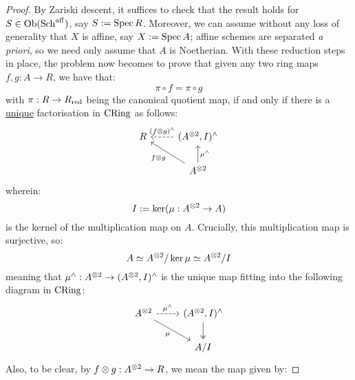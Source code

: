             \begin{proof}
                By Zariski descent, it suffices to check that the result holds for $S \in \mathrm{Ob}(\mathrm{Sch}^{\mathrm{aff}})$, say $S := \operatorname{Spec} R$. Moreover, we can assume without any loss of generality that $X$ is affine, say $X := \operatorname{Spec} A$; affine schemes are separated \textit{a priori}, so we need only assume that $A$ is Noetherian. With these reduction steps in place, the problem now becomes to prove that given any two ring maps $f, g: A \to R$, we have that:
                    $$\pi \circ f = \pi \circ g$$
                with $\pi: R \to R_{\mathrm{red}}$ being the canonical quotient map, if and only if there is a \underline{unique} factorisation in $\mathrm{CRing}$ as follows:
                    \begin{equation} \label{diagram: formal_neighbourhood_of_diagonal_algebraic}
                        \begin{tikzcd}
                        R & {(A^{\tensor 2}, I)^{\wedge}} \\
                        & {A^{\tensor 2}}
                        \arrow["{(f \tensor g)^{\wedge}}"', dashed, from=1-2, to=1-1]
                        \arrow["{f \tensor g}", from=2-2, to=1-1]
                        \arrow["{\mu^{\wedge}}"', from=2-2, to=1-2]
                        \end{tikzcd}
                    \end{equation}
                wherein:
                    $$I := \ker(\mu: A^{\tensor 2} \to A)$$
                is the kernel of the multiplication map on $A$. Crucially, this multiplication map is surjective, so:
                    $$A \cong A^{\tensor 2}/\ker \mu \cong A^{\tensor 2}/I$$
                meaning that $\mu^{\wedge}: A^{\tensor 2} \to (A^{\tensor 2}, I)^{\wedge}$ is the unique map fitting into the following diagram in $\mathrm{CRing}$:
                    \begin{equation} \label{diagram: formally_completed_multiplication}
                        \begin{tikzcd}
                    	{A^{\tensor 2}} & {(A^{\tensor 2}, I)^{\wedge}} \\
                    	& {A/I}
                    	\arrow["{\mu^{\wedge}}", dashed, from=1-1, to=1-2]
                    	\arrow["\mu"', from=1-1, to=2-2]
                    	\arrow[two heads, from=1-2, to=2-2]
                        \end{tikzcd}
                    \end{equation}
                Also, to be clear, by $f \tensor g: A^{\tensor 2} \to R$, we mean the map given by:

\end{proof}
